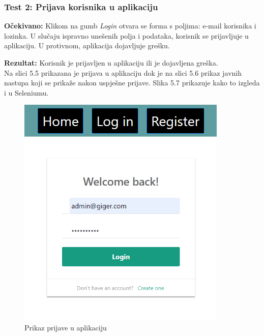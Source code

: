 			\subsubsection{Test 2: Prijava korisnika u aplikaciju}
			\textbf{Očekivano:} Klikom na gumb \textit{Login} otvara se forma s poljima: e-mail korisnika i lozinka. U slučaju ispravno unešenih polja i podataka, korisnik se prijavljuje u aplikaciju. U protivnom, aplikacija dojavljuje grešku.
			
			\noindent\textbf{Rezultat:} Korisnik je prijavljen u aplikaciju ili je dojavljena greška.\\
			
			Na slici 5.5 prikazana je prijava u aplikaciju dok je na slici 5.6 prikaz javnih nastupa koji se prikaže nakon uspješne prijave. Slika 5.7 prikazuje kako to izgleda i u Seleniumu. 
			
			\begin{figure}[H]
				\begin{center}
					\includegraphics[width=10cm]{slike/login_screen.PNG}
				\end{center}
				\caption{Prikaz prijave u aplikaciju}
				\label{fig:login}
			\end{figure}
		
